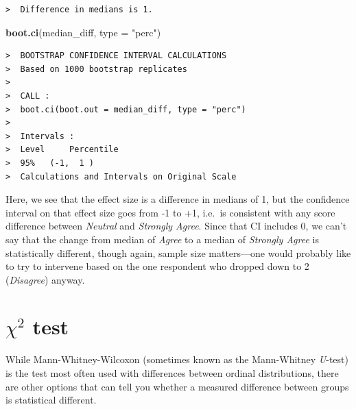 \documentclass[]{book}
\newenvironment{Shaded}{\begin{snugshade}}{\end{snugshade}}
\newcommand{\KeywordTok}[1]{\textcolor[rgb]{0.13,0.29,0.53}{\textbf{{#1}}}}
\newcommand{\DataTypeTok}[1]{\textcolor[rgb]{0.13,0.29,0.53}{{#1}}}
\newcommand{\DecValTok}[1]{\textcolor[rgb]{0.00,0.00,0.81}{{#1}}}
\newcommand{\StringTok}[1]{\textcolor[rgb]{0.31,0.60,0.02}{{#1}}}
\newcommand{\NormalTok}[1]{{#1}}
\begin{document}
\begin{Shaded}
\end{Shaded}

\begin{verbatim}
>  Difference in medians is 1.
\end{verbatim}

\begin{Shaded}
\begin{Highlighting}[]
\KeywordTok{boot.ci}\NormalTok{(median_diff, }\DataTypeTok{type =} \StringTok{"perc"}\NormalTok{) }
\end{Highlighting}
\end{Shaded}

\begin{verbatim}
>  BOOTSTRAP CONFIDENCE INTERVAL CALCULATIONS
>  Based on 1000 bootstrap replicates
>  
>  CALL : 
>  boot.ci(boot.out = median_diff, type = "perc")
>  
>  Intervals : 
>  Level     Percentile     
>  95%   (-1,  1 )  
>  Calculations and Intervals on Original Scale
\end{verbatim}

Here, we see that the effect size is a difference in medians of 1, but
the confidence interval on that effect size goes from -1 to +1, i.e.~is
consistent with any score difference between \emph{Neutral} and
\emph{Strongly Agree}. Since that CI includes 0, we can't say that the
change from median of \emph{Agree} to a median of \emph{Strongly Agree}
is statistically different, though again, sample size matters---one
would probably like to try to intervene based on the one respondent who
dropped down to 2 (\emph{Disagree}) anyway.

\section{\texorpdfstring{\(\chi^2\)
test}{\textbackslash{}chi\^{}2 test}}\label{chi2-test}

While Mann-Whitney-Wilcoxon (sometimes known as the Mann-Whitney
\emph{U}-test) is the test most often used with differences between
ordinal distributions, there are other options that can tell you whether
a measured difference between groups is statistical different.
\end{document}
